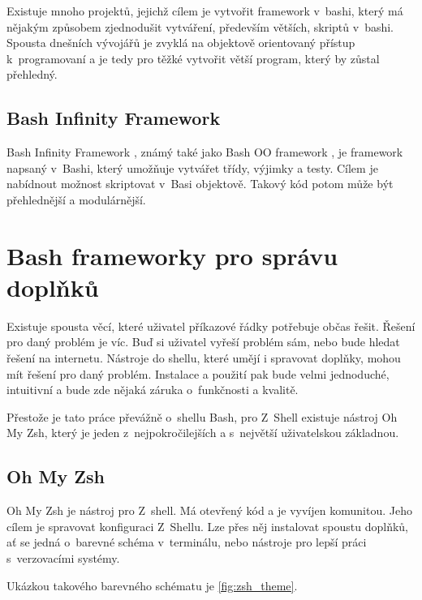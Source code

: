 \documentclass[thesis=M,czech]{FITthesis}[2012/06/26]
\begin{document}
Existuje mnoho projektů, jejichž cílem je vytvořit framework v~bashi, který má nějakým způsobem zjednodušit vytváření, především větších, skriptů v~bashi. Spousta dnešních vývojářů je zvyklá na objektově orientovaný přístup k~programovaní a je tedy pro těžké vytvořit větší program, který by zůstal přehledný.

\subsection{Bash Infinity Framework}
Bash Infinity Framework \cite{bashinfinity}, známý také jako Bash OO framework \cite{bashooframework}, je framework napsaný v~Bashi, který umožňuje vytvářet třídy, výjimky a testy. Cílem je nabídnout možnost skriptovat v~Basi objektově. Takový kód potom může být přehlednější a modulárnější.

%
%
%
%
%

\section{Bash frameworky pro správu doplňků}

Existuje spousta věcí, které uživatel příkazové řádky potřebuje občas řešit. Řešení pro daný problém je víc. Buď si uživatel vyřeší problém sám, nebo bude hledat řešení na internetu. Nástroje do shellu, které umějí i spravovat doplňky, mohou mít řešení pro daný problém. Instalace a použití pak bude velmi jednoduché, intuitivní a bude zde nějaká záruka o~funkčnosti a kvalitě.

Přestože je tato práce převážně o~shellu Bash, pro Z~Shell existuje nástroj Oh My Zsh, který je jeden z~nejpokročilejších a s~největší uživatelskou základnou.

%
%
%
\subsection{Oh My Zsh}

Oh My Zsh \cite{ohmyzsh} je nástroj pro Z~shell. Má otevřený kód a je vyvíjen komunitou. Jeho cílem je spravovat konfiguraci Z~Shellu. Lze přes něj instalovat spoustu doplňků, ať se jedná o~barevné schéma v~terminálu, nebo nástroje pro lepší práci s~verzovacími systémy.

Ukázkou takového barevného schématu je \ref{fig:zsh_theme}.
\end{document}

